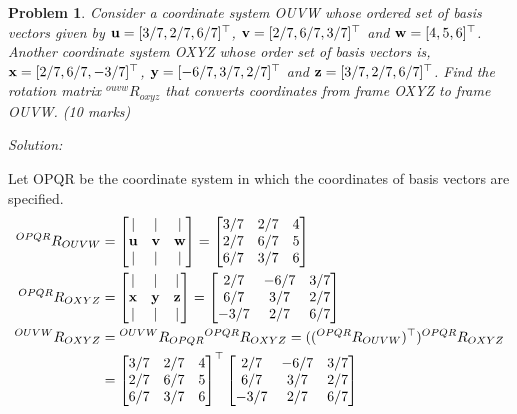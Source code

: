 \documentclass{article}
\newtheorem{prob}{Problem}
\newenvironment{solution}{\emph{Solution:}}{}
\begin{document}
\begin{prob}
  Consider a coordinate system OUVW whose ordered set of basis vectors given by
  $\mathbf{u} = [3/7, 2/7, 6/7]^\top$, $\mathbf{v} = [2/7, 6/7, 3/7]^\top$ and $\mathbf{w} = [4,
  5, 6]^\top$.
  Another coordinate system OXYZ whose order set of basis vectors is, $\mathbf{x} =
  [2/7, 6/7, -3/7]^\top$, $\mathbf{y} = [-6/7, 3/7, 2/7]^\top$ and $\mathbf{z} = [3/7, 2/7, 6/7]^\top$.
  Find the rotation matrix $^{ouvw}R_{oxyz}$ that converts coordinates from frame OXYZ to frame OUVW. (10 marks)
\end{prob}
\begin{solution}

Let OPQR be the coordinate system in which the coordinates of basis vectors are specified.
\begin{align}
  ^{OPQR}R_{OUVW} &= \begin{bmatrix}
    | & | & | \\
    \mathbf{u} & \mathbf{v} & \mathbf{w} \\
    | & | & | \\
  \end{bmatrix}
    = \begin{bmatrix}
    3/7 & 2/7 & 4 \\
    2/7 & 6/7 & 5  \\
    6/7 & 3/7 & 6 \\
  \end{bmatrix} \\
  ^{OPQR}R_{OXYZ} &= \begin{bmatrix}
    | & | & | \\
    \mathbf{x} & \mathbf{y} & \mathbf{z} \\
    | & | & | \\
  \end{bmatrix}
  = \begin{bmatrix}
    2/7 & -6/7 & 3/7 \\
    6/7 & 3/7 & 2/7  \\
    -3/7 & 2/7 & 6/7 \\
  \end{bmatrix} \\
    ^{OUVW}R_{OXYZ} &= {}^{OUVW}R_{OPQR} {}^{OPQR}R_{OXYZ} = (({}^{OPQR}R_{OUVW})^\top ) {}^{OPQR}R_{OXYZ}\\
&= \begin{bmatrix}
    3/7 & 2/7 & 4 \\
    2/7 & 6/7 & 5  \\
    6/7 & 3/7 & 6 \\
  \end{bmatrix}^\top
\begin{bmatrix}
    2/7 & -6/7 & 3/7 \\
    6/7 & 3/7 & 2/7  \\
    -3/7 & 2/7 & 6/7 \\
  \end{bmatrix}
\end{align}
\end{solution}
\newpage
\end{document}
